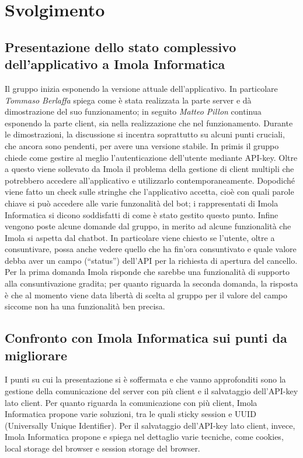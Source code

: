 \section{Svolgimento}
\subsection{Presentazione dello stato complessivo dell'applicativo a Imola Informatica}
Il gruppo inizia esponendo la versione attuale dell'applicativo. In particolare \textit{Tommaso Berlaffa} spiega come è stata realizzata la parte server e dà dimostrazione del suo funzionamento; in seguito \textit{Matteo Pillon} continua esponendo la parte client, sia nella realizzazione che nel funzionamento.
Durante le dimostrazioni, la discussione si incentra soprattutto su alcuni punti cruciali, che ancora sono pendenti, per avere una versione stabile. In primis il gruppo chiede come gestire al meglio l'autenticazione dell'utente mediante API-key. \newline 
Oltre a questo viene sollevato da Imola il problema della gestione di client multipli che potrebbero accedere all'applicativo e utilizzarlo contemporaneamente. \newline 
Dopodiché viene fatto un check sulle stringhe che l'applicativo accetta, cioè con quali parole chiave si può accedere alle varie funzonalità del bot; i rappresentati di Imola Informatica si dicono soddisfatti di come è stato gestito questo punto. \newline 
Infine vengono poste alcune domande dal gruppo, in merito ad alcune funzionalità che Imola si aspetta dal chatbot. In particolare viene chiesto se l'utente, oltre a consuntivare, possa anche vedere quello che ha fin'ora consuntivato e quale valore debba aver un campo (``status'') dell'API per la richiesta di apertura del cancello. Per la prima domanda Imola risponde che sarebbe una funzionalità di supporto alla consuntivazione gradita; per quanto riguarda la seconda domanda, la risposta è che al momento viene data libertà di scelta al gruppo per il valore del campo siccome non ha una funzionalità ben precisa.
\subsection{Confronto con Imola Informatica sui punti da migliorare}
I punti su cui la presentazione si è soffermata e che vanno approfonditi sono la gestione della comunicazione del server con più client e il salvataggio dell'API-key lato client. Per quanto riguarda la comunicazione con più client, Imola Informatica propone varie soluzioni, tra le quali sticky session e UUID (Universally Unique Identifier). Per il salvataggio dell'API-key lato client, invece, Imola Informatica propone e spiega nel dettaglio varie tecniche, come cookies, local storage del browser e session storage del browser.